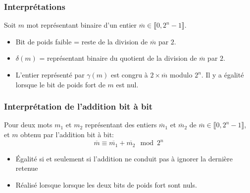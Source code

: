 \begin{frame}
  \frametitle{Interprétations}
Soit $m$ mot représentant binaire d'un entier $\overline{m}\in \llbracket 0, 2^{n}-1 \rrbracket$.
\begin{itemize}
  \item Bit de poids faible = reste de la division de $\overline{m}$ par $2$.
  \item $\delta(m)$ = représentant binaire du quotient de la division de $\overline{m}$ par $2$.
  \item L'entier représenté par $\gamma(m)$ est congru à $2\times\overline{m}$ modulo $2^{n}$. Il y a égalité lorsque le bit de poids fort de $m$ est nul.
\end{itemize}
\end{frame}

\begin{frame}
  \frametitle{Interprétation de l'addition bit à bit}
Pour deux mots $m_1$ et $m_2$ représentant des entiers $\overline{m}_1$ et $\overline{m}_2$ de $\overline{m}\in \llbracket 0, 2^{n}-1 \rrbracket$, et $m$ obtenu par l'addition bit à bit:
\begin{displaymath}
  \overline{m} \equiv \overline{m_1} + \overline{m_2} \mod 2^{n}
\end{displaymath}
\begin{itemize}
  \item \'Egalité si et seulement si l'addition ne conduit pas à ignorer la dernière retenue 
  \item Réalisé lorsque lorsque les deux bits de poids fort sont nuls.
\end{itemize}
\end{frame}

